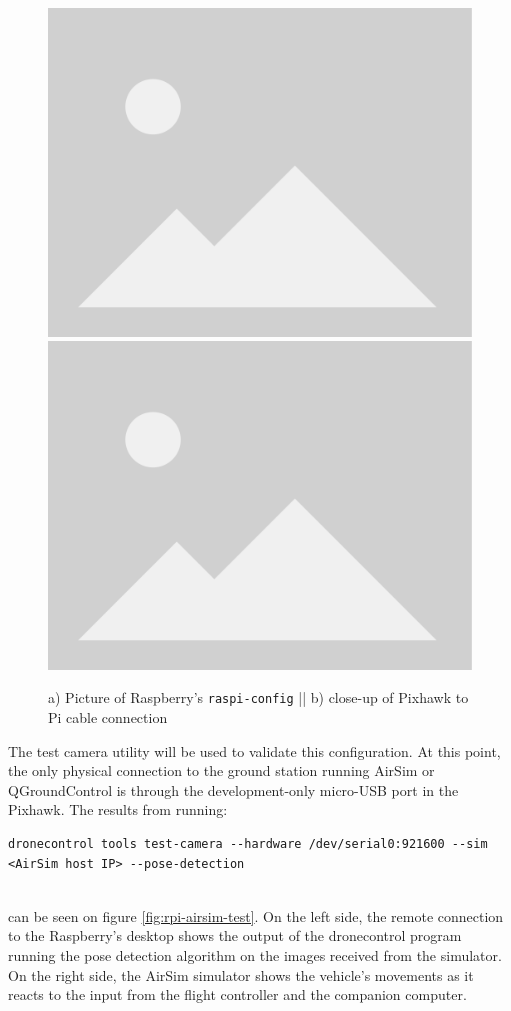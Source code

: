 \begin{figure}
  \centering
  \includegraphics[width=.45\textwidth, keepaspectratio]{img/placeholder.png}
  \includegraphics[width=.45\textwidth, keepaspectratio]{img/placeholder.png}
  \caption{a) Picture of Raspberry's \texttt{raspi-config} || b) close-up of Pixhawk to Pi cable connection}
  \label{fig:serial-connection}
\end{figure}

The test camera utility will be used to validate this configuration.
At this point, the only physical connection to the ground station running AirSim or QGroundControl is through the development-only micro-USB port in the Pixhawk.
The results from running: \\
\begin{listing}[h!]
    \begin{verbatim}
dronecontrol tools test-camera --hardware /dev/serial0:921600 --sim <AirSim host IP> --pose-detection
    \end{verbatim}
\end{listing}\\
can be seen on figure \ref{fig:rpi-airsim-test}.
On the left side, the remote connection to the Raspberry's desktop shows the output of the dronecontrol program running the pose detection algorithm on the images received from the simulator.
On the right side, the AirSim simulator shows the vehicle's movements as it reacts to the input from the flight controller and the companion computer.


